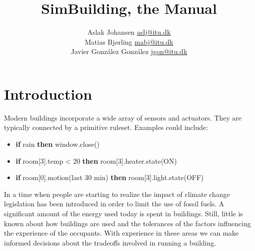 \documentclass[10pt]{article}
\title{SimBuilding, the Manual\\\scalebox{0.85}{a Discrete Event Simulator for Building Modeling}}
\author{Aslak Johansen \url{aslj@itu.dk}\\Matias Bjørling \url{mabj@itu.dk}\\Javier González González \url{jgon@itu.dk}}
\begin{document}
\maketitle
\tableofcontents
\newpage





\section{Introduction}

Modern buildings incorporate a wide array of sensors and actuators. They are typically connected by a primitive ruleset. Examples could include:
\begin{itemize}
  \item \textbf{if} rain \textbf{then} window.close()
  \item \textbf{if} room[3].temp < 20 \textbf{then} room[3].heater.state(ON)
  \item \textbf{if} room[0].motion(last 30 min) \textbf{then} room[3].light.state(OFF)
\end{itemize}

In a time when people are starting to realize the impact of climate change legislation has been introduced in order to limit the use of fossil fuels. A significant amount of the energy used today is spent in buildings. Still, little is known about how buildings are used and the tolerances of the factors influencing the experience of the occupants. With experience in these areas we can make informed decisions about the tradeoffs involved in running a building.
\end{document}
